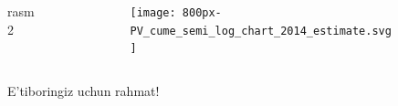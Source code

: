 \documentclass{beamer}
\begin{document}
\begin{frame}
	
	 \begin{columns}[T]
		\begin{column}{.25\textwidth}
			\begin{block}{}
rasm 2
			\end{block}
		\end{column}
		\begin{column}{.75\textwidth}
			\begin{block}{}
				\begin{figure}
					\centering
					\begin{figure}
						\centering
						\texttt{[image: 800px-PV\_cume\_semi\_log\_chart\_2014\_estimate.svg]}
						\caption{}
						\label{fig:800px-pvcumesemilogchart2014estimate}
					\end{figure}
				\end{figure}
			\end{block}
		\end{column}
	\end{columns}
\end{frame}

\begin{frame}{}
	    \Huge{E'tiboringiz uchun rahmat!}
\end{frame}
\end{document}
